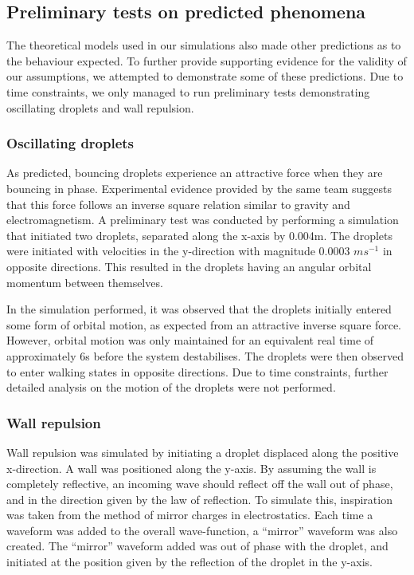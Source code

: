 \subsection{Preliminary tests on predicted phenomena}
The theoretical models used in our simulations also made other predictions as to the behaviour expected. To further provide supporting evidence for the validity of our  assumptions, we attempted to demonstrate some of these predictions. Due to time constraints, we only managed to run preliminary tests demonstrating oscillating droplets and wall repulsion.

\subsubsection{Oscillating droplets}

As predicted, \cite{brady2014bouncing} bouncing droplets experience an attractive force when they are bouncing in phase. Experimental evidence provided by the same team suggests that this force follows an inverse square relation similar to gravity and electromagnetism. A preliminary test was conducted by performing a simulation that initiated two droplets, separated along the x-axis by 0.004m. The droplets were initiated with velocities in the y-direction with magnitude 0.0003 $ms^{-1}$ in opposite directions. This resulted in the droplets having an angular orbital momentum between themselves.

In the simulation performed, it was observed that the droplets initially entered some form of orbital motion, as expected from an attractive inverse square force. However, orbital motion was only maintained for an equivalent real time of approximately 6s before the system destabilises. The droplets were then observed to enter walking states in opposite directions. Due to time constraints, further detailed analysis on the motion of the droplets were not performed. 

\subsubsection{Wall repulsion}

Wall repulsion was simulated by initiating a droplet displaced along the positive x-direction. A wall was positioned along the y-axis. By assuming the wall is completely reflective, an incoming wave should reflect off the wall out of phase, and in the direction given by the law of reflection. To simulate this, inspiration was taken from the method of mirror charges in electrostatics. Each time a waveform was added to the overall wave-function, a “mirror” waveform was also created. The “mirror” waveform added was out of phase with the droplet, and initiated at the position given by the reflection of the droplet in the y-axis.

